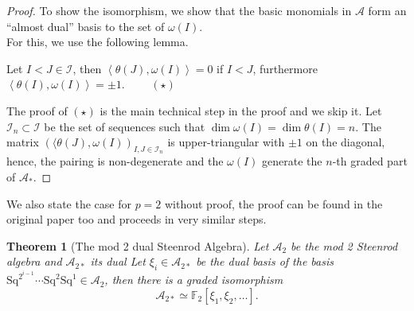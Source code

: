\documentclass[11pt, a4paper]{article}
\newcommand{\sq}{\mathrm{Sq}}
\newtheorem{thm}{Theorem}
\theoremstyle{plain}
\newtheorem*{proof}{Proof}
\begin{document}
\begin{proof}
To show the isomorphism, we show that the basic monomials in $\mathcal{A}$ form an ``almost dual'' basis to the set of $\omega( I) $.\\
For this, we use the following lemma.
\begin{center}
Let $I< J \in \mathcal{I}$, then $\left\langle \theta( J), \omega( I)\right\rangle = 0 $ if $I < J$, furthermore $\left\langle \theta( I) , \omega( I) \right\rangle = \pm 1$. $\qquad (\star)$ 
\end{center}
The proof of $(\star)$ is the main technical step in the proof and we skip it.
Let $\mathcal{I}_n \subset \mathcal{I}$ be the set of sequences such that $\dim \omega( I) = \dim \theta( I) =n$.
The matrix $\left( \langle \theta( J) ,\omega( I)  \right)_{I,J \in \mathcal{I}_n}$ is upper-triangular with $\pm 1$ on the diagonal, hence, the pairing is non-degenerate and the $\omega( I) $ generate the $n$-th graded part of $\mathcal{A}_\ast$.
\end{proof}
We also state the case for $p=2$ without proof, the proof can be found in the original paper too and proceeds in very similar steps.
\begin{thm}[The mod 2 dual Steenrod Algebra]
	Let $\mathcal{A}_2$ be the mod 2 Steenrod algebra and $\mathcal{A}_{2\ast} $ its dual
Let $\xi_i\in \mathcal{A}_{2\ast} $ be the dual basis of the basis $\sq^{2^{i-1}}\cdots \sq^{2}\sq^{1}\in \mathcal{A}_2$, then there is a graded isomorphism
\[ 
	\mathcal{A}_{2\ast} \simeq \mathbb{F}_2[\xi_1,\xi_2,\ldots].
\]

\end{thm}
\end{document}
